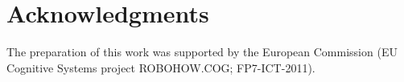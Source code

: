 \documentclass[10pt,letterpaper]{article}
\begin{document}
\section{Acknowledgments}
\vspace{-.2cm}
The preparation of this work was supported by the European Commission (EU Cognitive Systems project ROBOHOW.COG; FP7-ICT-2011).
\vspace{-.2cm}




\setlength{\bibleftmargin}{.125in}
\setlength{\bibindent}{-\bibleftmargin}


\end{document}
